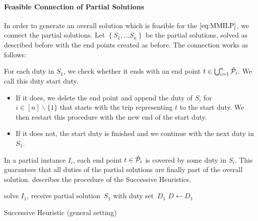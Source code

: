 \paragraph{Feasible Connection of Partial Solutions} \parfill

In order to generate an overall solution which is feasible for the $\eqref{eq:MMILP}$, we connect the partial solutions. Let ${\left\{S_1,\dots S_n\right\}}$ be the partial solutions, solved as described before with the end points created as before. The connection works as follows:

For each duty in $S_1$, we check whether it ends with an end point $t\in\bigcup_{i=1}^n\hat{\mathcal{P}}_i$. We call this duty start duty.
\begin{itemize}
	\item
		If it does, we delete the end point and append the duty of $S_i$ for ${i\in[n]\backslash\{1\}}$ that starts with the trip representing $t$ to the start duty. We then restart this procedure with the new end of the start duty.
	\item
		If it does not, the start duty is finished and we continue with the next duty in $S_1$.
\end{itemize}

In a partial instance $I_i$, each end point ${t\in\hat{\mathcal{P}}_i}$ is covered by some duty in $S_i$. This guarantees that all duties of the partial solutions are finally part of the overall solution.  describes the procedure of the Successive Heuristics.

\begin{algorithm}[htb]
	\SetAlgoLined
	solve $I_1$, receive partial solution~$S_1$ with duty set~$D_1$\;
	$D\gets D_1$\;
	\caption{Successive Heuristic (general setting)}
	\label{alg:successive_heuristic}
\end{algorithm}

